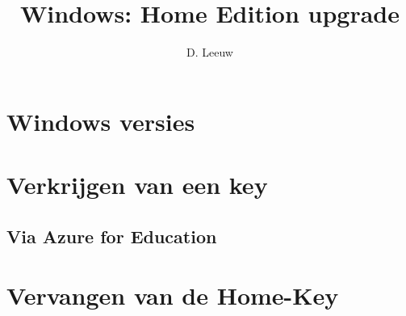 \documentclass[a4paper,12pt,twoside,titlepage]{article}
\author{D. Leeuw}
\title{Windows: Home Edition upgrade}
\date{\today\\
0.0.0
\vfill
\raggedright
\copyright\ 2026 Dennis Leeuw\\
}
\begin{document}

\maketitle



\section{Windows versies}

\section{Verkrijgen van een key}
\subsection{Via Azure for Education}

\section{Vervangen van de Home-Key}


\printindex
\end{document}
